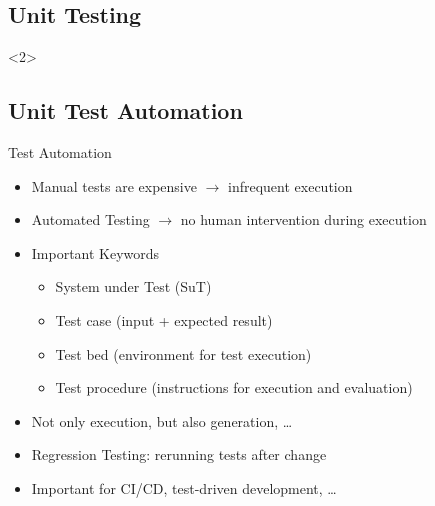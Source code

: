 \subsection{Unit Testing}
\begin{frame}<2>{\insertsubsection}
	\slideStagesTesting
\end{frame}


\subsection{Unit Test Automation}
\begin{frame}{\insertsubsection}
	\begin{fancycolumns}[animation=none, b]
		\begin{definition}{Test Automation \mysource{\cohnagile}}
			\begin{itemize}
				\item Manual tests are expensive $\rightarrow$ infrequent execution
				\item Automated Testing $\rightarrow$ no human intervention during execution
				\item Important Keywords
				\begin{itemize}
					\item System under Test (SuT)
					\item Test case (input + expected result)
					\item Test bed (environment for test execution)
					\item Test procedure (instructions for execution and evaluation)
				\end{itemize}
				\item Not only execution, but also generation, \dots
				\item Regression Testing: rerunning tests after change
				\item Important for CI/CD, test-driven development, \dots
			\end{itemize}
		\end{definition} \pause
		\nextcolumn
		\begin{center}
			\vspace{-15mm}
			\begin{fancycolumns}[animation=none]
				\centering
				\nextcolumn
				\centering
			\end{fancycolumns}
		\end{center}

\end{fancycolumns}
\end{frame}
